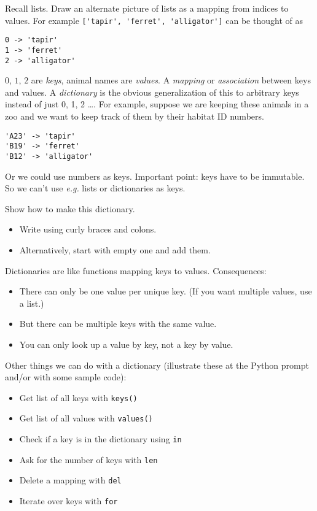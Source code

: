 \documentclass{article}
\newcommand{\eg}{\emph{e.g.}\xspace}
\begin{document}
Recall lists.  Draw an alternate picture of lists as a mapping from
indices to values. For example \verb|['tapir', 'ferret', 'alligator']|
can be thought of as
\begin{verbatim}
0 -> 'tapir'
1 -> 'ferret'
2 -> 'alligator'
\end{verbatim}
$0$, $1$, $2$ are \emph{keys}, animal names are \emph{values}.  A
\emph{mapping} or \emph{association} between keys and values.  A
\emph{dictionary} is the obvious generalization of this to arbitrary
keys instead of just 0, 1, 2 \dots.  For example, suppose we are
keeping these animals in a zoo and we want to keep track of them by
their habitat ID numbers.
\begin{verbatim}
'A23' -> 'tapir'
'B19' -> 'ferret'
'B12' -> 'alligator'
\end{verbatim}
Or we could use numbers as keys.  Important point: keys have to be
immutable.  So we can't use \eg lists or dictionaries as keys.

Show how to make this dictionary.
\begin{itemize}
\item Write using curly braces and colons.
\item Alternatively, start with empty one and add them.
\end{itemize}

Dictionaries are like functions mapping keys to values.  Consequences:
\begin{itemize}
\item There can only be one value per unique key.  (If you want
  multiple values, use a list.)
\item But there can be multiple keys with the same value.
\item You can only look up a value by key, not a key by value.
\end{itemize}

Other things we can do with a dictionary (illustrate these at the
Python prompt and/or with some sample code):
\begin{itemize}
\item Get list of all keys with \verb|keys()|
\item Get list of all values with \verb|values()|
\item Check if a key is in the dictionary using \verb|in|
\item Ask for the number of keys with \verb|len|
\item Delete a mapping with \verb|del|
\item Iterate over keys with \verb|for|
\end{itemize}
\end{document}
